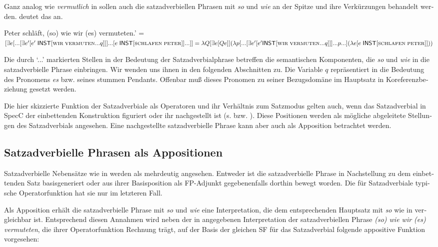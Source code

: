 \documentclass[output=paper, colorlinks, citecolor=brown, booklanguage=german]{langscibook}
\begin{document}
\begin{otherlanguage}{german}
Ganz analog wie \textit{vermutlich} in  sollen auch die satzadverbiellen Phrasen mit \textit{so} und \textit{wie} an der Spitze und ihre Verkürzungen behandelt werden.  deutet das an.

\ea \label{ex:zi97:44} Peter schläft, (so) wie wir (es) vermuteten.' = \\
$[\exists e [... [\exists e' [e' \; \cnst{inst} [\textsc{wir} \; \textsc{vermuten} ... q]]] %
... [e \; \cnst{inst} [\textsc{schlafen} \; \textsc{peter}]] ... ]] = %
\lambda Q [\exists e [Q e]] (\lambda p [... [\exists e' [e' \cnst{inst} [\textsc{wir} \; \textsc{vermuten} ... q ]]]...p...]\newline(\lambda e [e \; \cnst{inst} [\textsc{schlafen} \; \textsc{peter}]]))$
\z 

\noindent Die durch `...' markierten Stellen in der Bedeutung der Satzadverbialphrase betreffen die semantischen Komponenten, die \textit{so} und \textit{wie} in die satzadverbielle Phrase einbringen. Wir wenden uns ihnen in den folgenden Abschnitten zu. Die Variable $q$ repräsentiert in  die Bedeutung des
Pronomens \textit{es} bzw. seines stummen Pendants. Offenbar muß dieses Pronomen zu seiner Bezugsdomäne im Hauptsatz in Koreferenzbeziehung gesetzt werden.

Die hier skizzierte Funktion der Satzadverbiale als Operatoren und ihr Verhältnis zum Satzmodus gelten auch, wenn das Satzadverbial in SpecC der einbettenden Konstruktion figuriert oder ihr nachgestellt ist (s.  bzw. ). Diese Positionen werden als mögliche abgeleitete Stellungen des Satzadverbials angesehen. Eine nachgestellte satzadverbielle Phrase kann aber auch als Apposition betrachtet werden.

\subsection{Satzadverbielle Phrasen als Appositionen} \label{sec:zi97:3.2}

Satzadverbielle Nebensätze wie in  werden als mehrdeutig angesehen. Entweder ist die satzadverbielle Phrase in Nachstellung zu dem einbettenden Satz basisgeneriert oder aus ihrer Basisposition als FP-Adjunkt gegebenenfalls dorthin bewegt worden. Die für Satzadverbiale typische Operatorfunktion hat sie nur im letzteren Fall.

Als Apposition erhält die satzadverbielle Phrase mit \textit{so} und \textit{wie} eine Interpretation, die dem entsprechenden Hauptsatz mit \textit{so} wie in  vergleichbar ist. Entsprechend diesen Annahmen wird neben der in  angegebenen Interpretation der satzadverbiellen Phrase \textit{(so) wie wir (es) vermuteten}, die ihrer Operatorfunktion Rechnung trägt, auf der Basis der gleichen SF für das Satzadverbial folgende appositive Funktion vorgesehen:


\end{otherlanguage}
\end{document}
